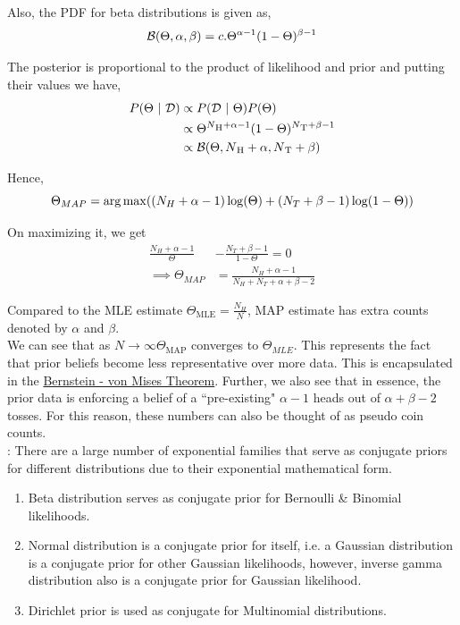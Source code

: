 Also, the PDF for beta distributions is given as,
$$
  \mathcal{B}(\Theta, \alpha, \beta) = c.\Theta^{\alpha - 1}(1-\Theta)^{\beta - 1}
$$

The posterior is proportional to the product of likelihood and prior and putting their values we have,
\begin{align*}
  P(\Theta \ | \  \mathcal{D}) & \propto  P(\mathcal{D} \ | \  \Theta)  P(\Theta)                                                      \\
                     & \propto \Theta^{N\textsubscript{H} + \alpha - 1}(1-\Theta)^{N\textsubscript{T} + \beta - 1} \\
                     & \propto \mathcal{B}(\Theta, N\textsubscript{H} + \alpha, N\textsubscript{T} + \beta)
\end{align*}

Hence,
$$
  \Theta_{MAP} = \operatorname*{arg\,max} ((N_H+\alpha-1)\log(\Theta) + (N_T+\beta-1)\log(1-\Theta))
$$

On maximizing it, we get
\begin{align*}
  \frac{N_H+\alpha-1}{\Theta} & - \frac{N_T+\beta-1}{1-\Theta} = 0            \\
  \implies \Theta_{MAP}       & = \frac{N_H+\alpha-1}{N_H+N_T+\alpha+\beta-2}
\end{align*}

Compared to the MLE estimate $\Theta_{\text{MLE}} = \frac{N_H}{N}$, MAP estimate has extra counts denoted by $\alpha$ and $\beta$. \\

We can see that as $N \to \infty \Theta_{\text{MAP}}$ converges to $\Theta_{MLE}$. This represents the fact that prior beliefs become less representative over more data. This is encapsulated in the \href{https://en.wikipedia.org/wiki/Bernstein\%E2\%80\%93von\_Mises\_theorem}{Bernstein - von Mises Theorem}. Further, we also see that in essence, the prior data is enforcing a belief of a ``pre-existing" $\alpha - 1$ heads out of $\alpha + \beta - 2$ tosses. For this reason, these numbers can also be thought of as pseudo coin counts. \\

: There are a large number of exponential families that serve as conjugate priors for different distributions due to their exponential mathematical form.
\begin{enumerate}
  \item Beta distribution serves as conjugate prior for Bernoulli \& Binomial likelihoods.
  \item Normal distribution is a conjugate prior for itself, i.e. a Gaussian distribution is a conjugate prior for other Gaussian likelihoods, however, inverse gamma distribution also is a conjugate prior for Gaussian likelihood.
  \item Dirichlet prior is used as conjugate for Multinomial distributions.
\end{enumerate}

